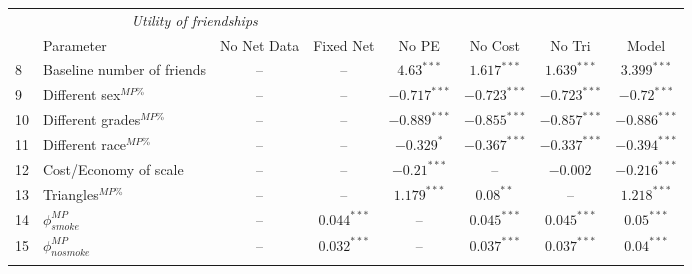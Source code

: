 \begin{table}[t!]
\begin{center}
\begin{small}
\begin{tabular}{llcccccc}
\\
\multicolumn{4}{c}{\textit{Utility of friendships}} \\
  & Parameter  & No Net Data  & Fixed Net  & No PE  & No Cost & No Tri  & Model  \\ \hline
  8 &Baseline number of friends               &            -- &            -- &  $4.63^{***}$ & $1.617^{***}$ & $1.639^{***}$ & $3.399^{***}$ \\ 
  9 &Different sex$^{MP\%}$                   &            -- &            -- &$-0.717^{***}$ &$-0.723^{***}$ &$-0.723^{***}$ & $-0.72^{***}$ \\ 
 10 &Different grades$^{MP\%}$                &            -- &            -- &$-0.889^{***}$ &$-0.855^{***}$ &$-0.857^{***}$ &$-0.886^{***}$ \\ 
 11 &Different race$^{MP\%}$                  &            -- &            -- &  $-0.329^{*}$ &$-0.367^{***}$ &$-0.337^{***}$ &$-0.394^{***}$ \\ 
 12 &Cost/Economy of scale                    &            -- &            -- & $-0.21^{***}$ &            -- &   $-0.002^{}$ &$-0.216^{***}$ \\ 
 13 &Triangles$^{MP\%}$                       &            -- &            -- & $1.179^{***}$ &   $0.08^{**}$ &            -- & $1.218^{***}$ \\ 
 14 &$\phi_{smoke}^{MP}$                      &            -- & $0.044^{***}$ &            -- & $0.045^{***}$ & $0.045^{***}$ &  $0.05^{***}$ \\ 
 15 &$\phi_{nosmoke}^{MP}$                    &            -- & $0.032^{***}$ &            -- & $0.037^{***}$ & $0.037^{***}$ &  $0.04^{***}$ \\ 

\\ \hline
\end{tabular}%
\end{small}
\end{center}
 
\end{table}
